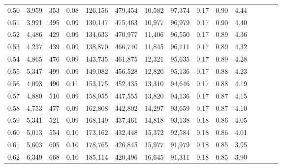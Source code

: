 \begin{tabular}{rrrcrrrrrrrrrrr}
0.50 &   3,959 &    353 &                                       0.08 &  126,156 &  479,454 &   10,582 &   97,374 &  0.17 &  0.90 &                         4.44 \\
0.51 &   3,991 &    395 &                                       0.09 &  130,147 &  475,463 &   10,977 &   96,979 &  0.17 &  0.90 &                         4.40 \\
0.52 &   4,486 &    429 &                                       0.09 &  134,633 &  470,977 &   11,406 &   96,550 &  0.17 &  0.89 &                         4.36 \\
0.53 &   4,237 &    439 &                                       0.09 &  138,870 &  466,740 &   11,845 &   96,111 &  0.17 &  0.89 &                         4.32 \\
0.54 &   4,865 &    476 &                                       0.09 &  143,735 &  461,875 &   12,321 &   95,635 &  0.17 &  0.89 &                         4.28 \\
0.55 &   5,347 &    499 &                                       0.09 &  149,082 &  456,528 &   12,820 &   95,136 &  0.17 &  0.88 &                         4.23 \\
0.56 &   4,093 &    490 &                                       0.11 &  153,175 &  452,435 &   13,310 &   94,646 &  0.17 &  0.88 &                         4.19 \\
0.57 &   4,880 &    510 &                                       0.09 &  158,055 &  447,555 &   13,820 &   94,136 &  0.17 &  0.87 &                         4.15 \\
0.58 &   4,753 &    477 &                                       0.09 &  162,808 &  442,802 &   14,297 &   93,659 &  0.17 &  0.87 &                         4.10 \\
0.59 &   5,341 &    521 &                                       0.09 &  168,149 &  437,461 &   14,818 &   93,138 &  0.18 &  0.86 &                         4.05 \\
0.60 &   5,013 &    554 &                                       0.10 &  173,162 &  432,448 &   15,372 &   92,584 &  0.18 &  0.86 &                         4.01 \\
0.61 &   5,603 &    605 &                                       0.10 &  178,765 &  426,845 &   15,977 &   91,979 &  0.18 &  0.85 &                         3.95 \\
0.62 &   6,349 &    668 &                                       0.10 &  185,114 &  420,496 &   16,645 &   91,311 &  0.18 &  0.85 &                         3.90 \\

\end{tabular}
